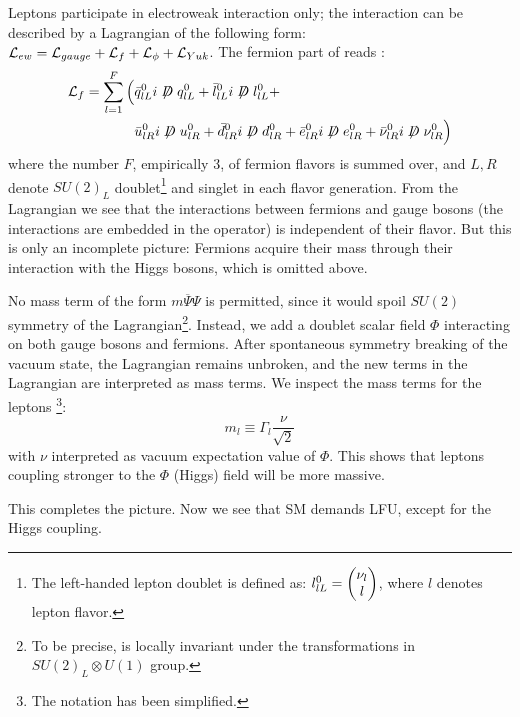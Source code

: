 Leptons participate in electroweak interaction only;
the interaction can be described by a Lagrangian of the following form:
$\mathcal{L}_{ew} = \mathcal{L}_{gauge} + \mathcal{L}_{f} + \mathcal{L}_{\phi} + \mathcal{L}_{Yuk}$.
The fermion part of  reads \cite{Langacker:2010zza}:
\begin{align*}
    \Lden{f} = \sum_{l = 1}^F \Big(
        & \bar{\spin{q}}^0_{lL} i \fsl{D} \spin{q}^0_{lL} +
          \bar{\spin{l}}^0_{lL} i \fsl{D} \spin{l}^0_{lL} + \\
        & \bar{u}^0_{lR} i \fsl{D} u^0_{lR} +
          \bar{d}^0_{lR} i \fsl{D} d^0_{lR} +
          \bar{e}^0_{lR} i \fsl{D} e^0_{lR} +
          \bar{\nu}^0_{lR} i \fsl{D} \nu^0_{lR}
    \Big)
\end{align*}
where the number $F$, empirically 3, of fermion flavors is summed over, and
$L,R$ denote $SU(2)_L$ doublet\footnote{
    The left-handed lepton doublet is defined as:
    $l^0_{lL} = \begin{pmatrix} \nu_l \\ l \end{pmatrix}$,
    where $l$ denotes lepton flavor.
}
and singlet in each flavor generation.
From the Lagrangian we see that the interactions between fermions and gauge
bosons (the interactions are embedded in the  operator) is independent
of their flavor.
But this is only an incomplete picture:
Fermions acquire their mass through their interaction with the Higgs bosons,
which is omitted above.

No mass term of the form $m \overline{\Psi} \Psi$ is permitted, since it would
spoil $SU(2)$ symmetry of the Lagrangian\footnote{
    To be precise,  is locally invariant under the transformations in
    $SU(2)_L \otimes U(1)$ group.
}.
Instead, we add a doublet scalar field $\Phi$ interacting on both gauge bosons
and fermions.
After spontaneous symmetry breaking of the vacuum state, the Lagrangian remains
unbroken, and the new terms in the Lagrangian are interpreted as mass terms.
We inspect the mass terms for the leptons \cite{Langacker:2010zza}\footnote{
    The notation has been simplified.
}:
\begin{equation*}
    m_l \equiv \Gamma_l \frac{\nu}{\sqrt{2}}
\end{equation*}
with $\nu$ interpreted as vacuum expectation value of $\Phi$.
This shows that leptons coupling stronger to the $\Phi$ (Higgs) field will be
more massive.

This completes the picture.
Now we see that SM demands LFU, except for the Higgs coupling.
